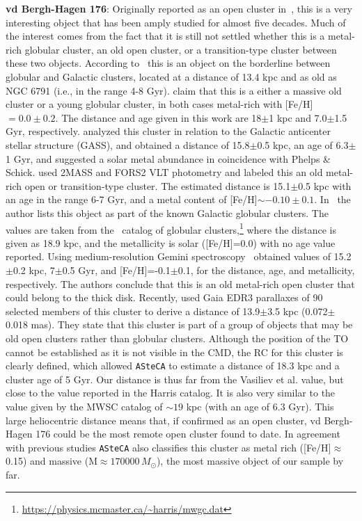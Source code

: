 \documentclass{aa}
\begin{document}
\begin{appendix}
  \noindent \textbf{vd Bergh-Hagen 176}: Originally reported as an open cluster
  in~\cite{vandenBergh_1975}, this is a very interesting object that has been
  amply studied for  almost five decades. Much of the interest
  comes from the fact that it is still not settled whether this is a metal-rich
  globular cluster, an old open cluster, or a transition-type cluster  between
  these two objects.
  According to~\cite{Ortolani_1995} this is an object on the borderline
  between globular and Galactic clusters, located at a distance of 13.4 kpc
  and as old as NGC 6791 (i.e., in the range 4-8 Gyr).
  \cite{Phelps_2003} claim that this is a either a massive old cluster or a
  young globular cluster, in both cases metal-rich with [Fe/H]$=0.0\pm0.2$.
  The distance and age given in this work are 18$\pm$1 kpc and 7.0$\pm$1.5 Gyr,
  respectively.
  \cite{Frinchaboy_2006} analyzed this cluster in relation to the Galactic
  anticenter stellar structure (GASS), and obtained a distance of 15.8$\pm$0.5
  kpc, an age of 6.3$\pm$1 Gyr, and suggested a solar metal abundance in
  coincidence with Phelps \& Schick.
  \cite{Davoust_2011} used 2MASS and FORS2 VLT photometry and labeled this an
  old metal-rich open or transition-type cluster. The estimated  distance is
  15.1$\pm$0.5 kpc with an age in the range 6-7 Gyr, and a metal content of
  [Fe/H]$\sim-0.10\pm0.1$.
  In~\cite{vandenBergh_2011} the author lists this object as part of the known
  Galactic globular clusters. The values are taken from
  the~\cite{Harris_1996,Harris_2010} catalog of globular
  clusters,\footnote{\url{https://physics.mcmaster.ca/~harris/mwgc.dat}}
  where the distance is given as 18.9 kpc,
  and the metallicity is solar ([Fe/H]=0.0) with no age value reported.
  Using medium-resolution Gemini spectroscopy~\cite{Sharina_2014} obtained
  values of 15.2$\pm$0.2 kpc, 7$\pm$0.5 Gyr, and [Fe/H]=-0.1$\pm$0.1, for the
  distance, age, and metallicity, respectively. The authors conclude that this
  is an old metal-rich open cluster that could belong to the thick disk.
  Recently, \cite{Vasiliev_2021} used Gaia EDR3 parallaxes of 90 selected
  members of this cluster to derive a distance of 13.9$\pm$3.5 kpc
  (0.072$\pm$0.018 mas). They state that this cluster is part of a group of
  objects that may be old open clusters rather than globular clusters.
  Although the position of the TO cannot be established as it is not visible
  in the CMD, the RC for this cluster is clearly defined, which allowed
  \texttt{ASteCA} to estimate a distance of 18.3 kpc and a cluster age of 5
  Gyr. Our distance is thus far from the Vasiliev et al. value, but close to the
  value reported in the Harris catalog. It is also very similar to the value
  given by the MWSC catalog of $\sim19$ kpc (with an age of 6.3 Gyr).
  This large heliocentric distance means that, if confirmed as an open
  cluster, vd Bergh-Hagen 176 could be the most remote open cluster found to
  date. In agreement with previous studies \texttt{ASteCA} also classifies this
  cluster as metal rich ([Fe/H]$\approx$0.15) and massive (M$\approx170000\,
  M_{\odot}$), the most massive object of our sample by far.\\


\end{appendix}
\end{document}
